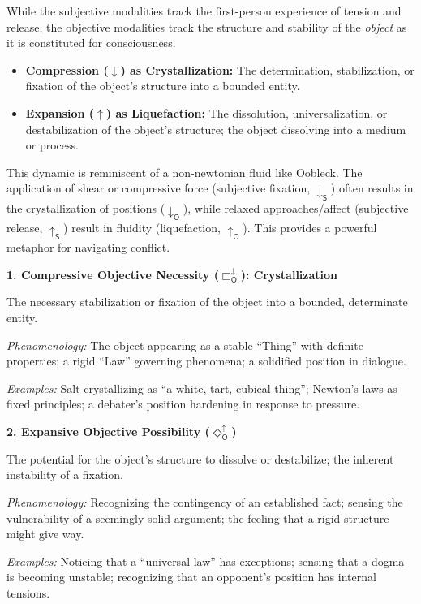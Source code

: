 \documentclass[12pt]{book}
\newcommand{\OBoxDown}{\Box_{\mathsf{O}}^{\downarrow}}
\newcommand{\ODiaUp}{\Diamond_{\mathsf{O}}^{\uparrow}}
\begin{document}
While the subjective modalities track the first-person experience of tension and release, the objective modalities track the structure and stability of the \textit{object} as it is constituted for consciousness.

\begin{itemize}
    \item \textbf{Compression ($\downarrow$) as Crystallization:} The determination, stabilization, or fixation of the object's structure into a bounded entity.
    \item \textbf{Expansion ($\uparrow$) as Liquefaction:} The dissolution, universalization, or destabilization of the object's structure; the object dissolving into a medium or process.
\end{itemize}

This dynamic is reminiscent of a non-newtonian fluid like Oobleck. The application of shear or compressive force (subjective fixation, $\downarrow_{\mathsf{S}}$) often results in the crystallization of positions ($\downarrow_{\mathsf{O}}$), while relaxed approaches/affect (subjective release, $\uparrow_{\mathsf{S}}$) result in fluidity (liquefaction, $\uparrow_{\mathsf{O}}$). This provides a powerful metaphor for navigating conflict.

\bigskip

\noindent\textbf{1. Compressive Objective Necessity ($\OBoxDown$): Crystallization}

The necessary stabilization or fixation of the object into a bounded, determinate entity.

\textit{Phenomenology:} The object appearing as a stable ``Thing'' with definite properties; a rigid ``Law'' governing phenomena; a solidified position in dialogue.

\textit{Examples:} Salt crystallizing as ``a white, tart, cubical thing''; Newton's laws as fixed principles; a debater's position hardening in response to pressure.

\bigskip

\noindent\textbf{2. Expansive Objective Possibility ($\ODiaUp$)}

The potential for the object's structure to dissolve or destabilize; the inherent instability of a fixation.

\textit{Phenomenology:} Recognizing the contingency of an established fact; sensing the vulnerability of a seemingly solid argument; the feeling that a rigid structure might give way.

\textit{Examples:} Noticing that a ``universal law'' has exceptions; sensing that a dogma is becoming unstable; recognizing that an opponent's position has internal tensions.
\end{document}
